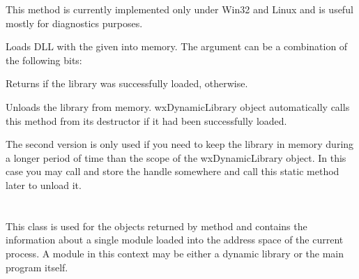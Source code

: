 This method is currently implemented only under Win32 and Linux and is useful
mostly for diagnostics purposes.


\label{wxdynamiclibraryload}


Loads DLL with the given  into memory. The  argument can
be a combination of the following bits:

\begin{twocollist}
\end{twocollist}

Returns \true if the library was successfully loaded, \false otherwise.


\label{wxdynamiclibraryunload}



Unloads the library from memory. wxDynamicLibrary object automatically calls
this method from its destructor if it had been successfully loaded.

The second version is only used if you need to keep the library in memory
during a longer period of time than the scope of the wxDynamicLibrary object.
In this case you may call  and store
the handle somewhere and call this static method later to unload it.


\section{}\label{wxdynamiclibrarydetails}

This class is used for the objects returned by 
 method and
contains the information about a single module loaded into the address space of
the current process. A module in this context may be either a dynamic library
or the main program itself.

